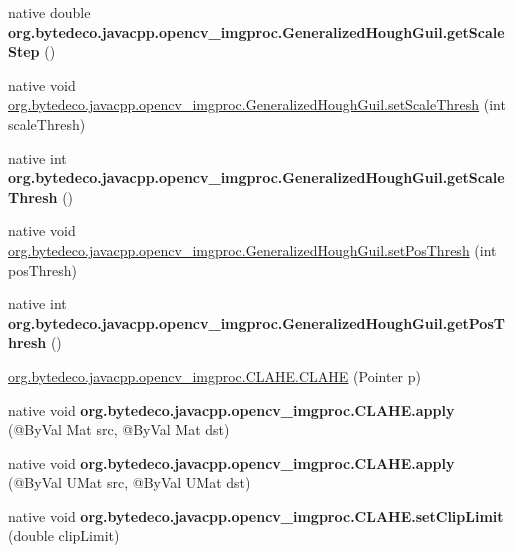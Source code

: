 \begin{DoxyCompactItemize}
\item 
\mbox{\label{group__imgproc_gafced1775943ca7260dd847c8a27511fc}} 
native double {\bfseries org.\+bytedeco.\+javacpp.\+opencv\+\_\+imgproc.\+Generalized\+Hough\+Guil.\+get\+Scale\+Step} ()
\item 
native void \hyperlink{group__imgproc_ga09e4c27dd4351588315bc5b3fe754a7f}{org.\+bytedeco.\+javacpp.\+opencv\+\_\+imgproc.\+Generalized\+Hough\+Guil.\+set\+Scale\+Thresh} (int scale\+Thresh)
\item 
\mbox{\label{group__imgproc_gaf69c388a9eb70ceb71f56299c07440b1}} 
native int {\bfseries org.\+bytedeco.\+javacpp.\+opencv\+\_\+imgproc.\+Generalized\+Hough\+Guil.\+get\+Scale\+Thresh} ()
\item 
native void \hyperlink{group__imgproc_ga5c699f44c50f521fee2c6103fe9686a4}{org.\+bytedeco.\+javacpp.\+opencv\+\_\+imgproc.\+Generalized\+Hough\+Guil.\+set\+Pos\+Thresh} (int pos\+Thresh)
\item 
\mbox{\label{group__imgproc_ga51015d97daa421ac7162c18d76a8ddba}} 
native int {\bfseries org.\+bytedeco.\+javacpp.\+opencv\+\_\+imgproc.\+Generalized\+Hough\+Guil.\+get\+Pos\+Thresh} ()
\item 
\hyperlink{group__imgproc_ga088af9aa661b76b4381a4635c06ec8c8}{org.\+bytedeco.\+javacpp.\+opencv\+\_\+imgproc.\+C\+L\+A\+H\+E.\+C\+L\+A\+HE} (Pointer p)
\item 
\mbox{\label{group__imgproc_gad4d7e44b2ae58f719133df9466961fa6}} 
native void {\bfseries org.\+bytedeco.\+javacpp.\+opencv\+\_\+imgproc.\+C\+L\+A\+H\+E.\+apply} (@By\+Val Mat src, @By\+Val Mat dst)
\item 
\mbox{\label{group__imgproc_ga0f3d8b485b63c69219686b665045c741}} 
native void {\bfseries org.\+bytedeco.\+javacpp.\+opencv\+\_\+imgproc.\+C\+L\+A\+H\+E.\+apply} (@By\+Val U\+Mat src, @By\+Val U\+Mat dst)
\item 
\mbox{\label{group__imgproc_ga92c10fd0caca24a83a7a9cba63a25504}} 
native void {\bfseries org.\+bytedeco.\+javacpp.\+opencv\+\_\+imgproc.\+C\+L\+A\+H\+E.\+set\+Clip\+Limit} (double clip\+Limit)
\item 
\mbox{\label{group__imgproc_gad3edfaff410d65e264cf2e596f4028a6}} 

\end{DoxyCompactItemize}
